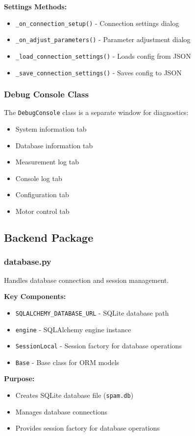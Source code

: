\documentclass[11pt,a4paper]{article}
\begin{document}
\textbf{Settings Methods:}
\begin{itemize}
    \item \texttt{\_on\_connection\_setup()} - Connection settings dialog
    \item \texttt{\_on\_adjust\_parameters()} - Parameter adjustment dialog
    \item \texttt{\_load\_connection\_settings()} - Loads config from JSON
    \item \texttt{\_save\_connection\_settings()} - Saves config to JSON
\end{itemize}

\subsubsection{Debug Console Class}
The \texttt{DebugConsole} class is a separate window for diagnostics:
\begin{itemize}
    \item System information tab
    \item Database information tab
    \item Measurement log tab
    \item Console log tab
    \item Configuration tab
    \item Motor control tab
\end{itemize}

\subsection{Backend Package}

\subsubsection{database.py}
Handles database connection and session management.

\textbf{Key Components:}
\begin{itemize}
    \item \texttt{SQLALCHEMY\_DATABASE\_URL} - SQLite database path
    \item \texttt{engine} - SQLAlchemy engine instance
    \item \texttt{SessionLocal} - Session factory for database operations
    \item \texttt{Base} - Base class for ORM models
\end{itemize}

\textbf{Purpose:}
\begin{itemize}
    \item Creates SQLite database file (\texttt{spam.db})
    \item Manages database connections
    \item Provides session factory for database operations
\end{itemize}
\end{document}
